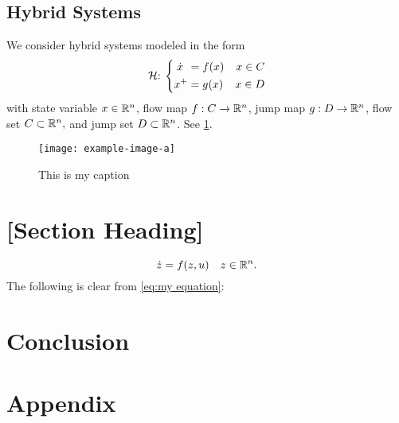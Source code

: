 \subsection{Hybrid Systems}
We consider hybrid systems modeled in the form \cite{goebel_hybrid_2012}
\begin{equation}
    {\mathcal{H}}{:}\: \left\{\begin{aligned}
        \dot x \hspace{4pt}&= f(x) & x \in C \\
        x^+ &= g(x) & x \in D
    \end{aligned}\right. 
    \label{eq:hybrid system}
\end{equation}
with state variable $x\in \mathbb{R}^{n}$, 
flow map $f : C \to \mathbb{R}^{n}$, 
jump map $g : D \to \mathbb{R}^{n}$, 
flow set $C \subset \mathbb{R}^{n},$ and
jump set $D \subset \mathbb{R}^{n}$.
See \cref{fig:this is a figure}.

\begin{figure}[htbp]
    \centering
    \texttt{[image: example-image-a]}
    \caption{This is my caption}
    \label{fig:this is a figure}
\end{figure}

\lipsum[7]

\section{[Section Heading]}

\lipsum[9]
\begin{equation}
    \label{eq:my equation}
    \dot z = f(z,u) \quad z \in \mathbb{R}^n.
\end{equation}
The following is clear from \cref{eq:my equation}:
\lipsum[10-11]

\section{Conclusion}
\label{sec:conclusion}
\lipsum[12]


\nocite{knuth:ct:a}
\nocite{glashow}
\nocite{aristotle:physics}
\nocite{moore}
\nocite{salam}
\nocite{ctan}
\nocite{loh}
\printbibliography

\appendix
\section{Appendix}
\label{sec:appendix}

\lipsum[1]
